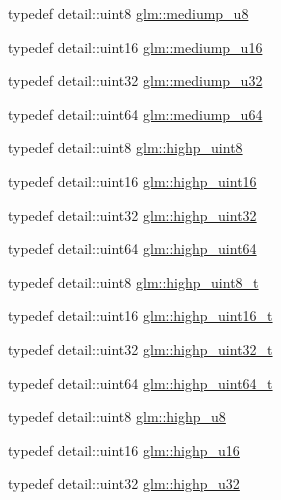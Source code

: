 \begin{DoxyCompactItemize}
\item 
typedef detail\+::uint8 \hyperlink{group__gtc__type__precision_gac04b372784392e82bd557f300c4de097}{glm\+::mediump\+\_\+u8}
\item 
typedef detail\+::uint16 \hyperlink{group__gtc__type__precision_ga6745262ef6a6fdb8637b2387ef924828}{glm\+::mediump\+\_\+u16}
\item 
typedef detail\+::uint32 \hyperlink{group__gtc__type__precision_gad0c27a525045c299a92306eb4cd7c13a}{glm\+::mediump\+\_\+u32}
\item 
typedef detail\+::uint64 \hyperlink{group__gtc__type__precision_ga00c51a16fa190b0a90205d50d6d8a44a}{glm\+::mediump\+\_\+u64}
\item 
typedef detail\+::uint8 \hyperlink{group__gtc__type__precision_ga2c27c6dd26e893786f04b10f99c1ee95}{glm\+::highp\+\_\+uint8}
\item 
typedef detail\+::uint16 \hyperlink{group__gtc__type__precision_ga4d32967d45ba8365e2a05eaaac85e978}{glm\+::highp\+\_\+uint16}
\item 
typedef detail\+::uint32 \hyperlink{group__gtc__type__precision_ga3145e44c73e2df7dfe4f3cb65974bf22}{glm\+::highp\+\_\+uint32}
\item 
typedef detail\+::uint64 \hyperlink{group__gtc__type__precision_ga8079c653e20cda03d34b99de629a7b09}{glm\+::highp\+\_\+uint64}
\item 
typedef detail\+::uint8 \hyperlink{group__gtc__type__precision_ga9ba529fcc75b82d23da979f0ce6e4518}{glm\+::highp\+\_\+uint8\+\_\+t}
\item 
typedef detail\+::uint16 \hyperlink{group__gtc__type__precision_ga3145bc0ee80432c165e985a188a722b3}{glm\+::highp\+\_\+uint16\+\_\+t}
\item 
typedef detail\+::uint32 \hyperlink{group__gtc__type__precision_ga8eb85ad460079c63b68866ae34637bda}{glm\+::highp\+\_\+uint32\+\_\+t}
\item 
typedef detail\+::uint64 \hyperlink{group__gtc__type__precision_ga6e66f40c5909bfc872b068187fa6029e}{glm\+::highp\+\_\+uint64\+\_\+t}
\item 
typedef detail\+::uint8 \hyperlink{group__gtc__type__precision_ga8a60abe782749c504fb5ae51eb8b49cc}{glm\+::highp\+\_\+u8}
\item 
typedef detail\+::uint16 \hyperlink{group__gtc__type__precision_ga9da2178d7501d9c0f225fa1a7b70cb45}{glm\+::highp\+\_\+u16}
\item 
typedef detail\+::uint32 \hyperlink{group__gtc__type__precision_gae8e8a2c712653891a03c171795286ac5}{glm\+::highp\+\_\+u32}

\end{DoxyCompactItemize}
